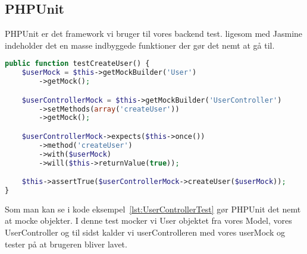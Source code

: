 \subsection{PHPUnit}
PHPUnit er det framework vi bruger til vores backend test. ligesom med Jasmine indeholder det
en masse indbyggede funktioner der gør det nemt at gå til.
\begin{lstlisting}[caption={UserControllerTest.php}, language={PHP}, label={lst:UserControllerTest}]
public function testCreateUser() {
    $userMock = $this->getMockBuilder('User')
        ->getMock();

    $userControllerMock = $this->getMockBuilder('UserController')
        ->setMethods(array('createUser'))
        ->getMock();

    $userControllerMock->expects($this->once())
        ->method('createUser')
        ->with($userMock)
        ->will($this->returnValue(true));

    $this->assertTrue($userControllerMock->createUser($userMock));
}
\end{lstlisting}
Som man kan se i kode eksempel~\ref{lst:UserControllerTest} gør PHPUnit det nemt at mocke objekter.
I denne test mocker vi User objektet fra vores Model, vores UserController og til sidst kalder vi userControlleren 
med vores userMock og tester på at brugeren bliver lavet.

